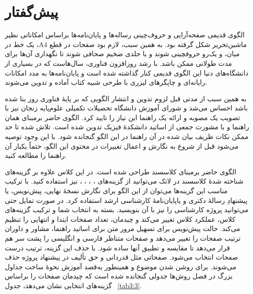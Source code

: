 \section*{پیش‌گفتار}
\thispagestyle{plain} %
الگوی قدیمی صفحه‌آرایی و حروف‌چینی رساله‌ها و پایان‌نامه‌ها براساس امکاناتی نظیر ماشین‌تحریر شکل گرفته بود. به همین سبب، لازم بود صفحات در قطع 
$\mathrm{A4}$، 
یک خط در میان، و یک‌رو حروفچینی شوند و با جلدی ضخیم صحافی شوند تا نگهداری آن‌ها برای مدت طولانی ممکن باشد. با رشد روزافزون فناوری، سال‌هاست که در بسیاری از دانشگاه‌های دنیا این الگوی قدیمی کنار گذاشته شده است و پایان‌نامه‌ها به مدد امکانات رایانه‌ای و چاپگرهای لیزری با طرحی شبیه کتاب آماده و تدوین می‌شوند.

به همین سبب از مدتی قبل لزوم تدوین و انتشار الگویی که بر پایهٔ فناوری روز بنا شده باشد احساس می‌شد و شورای آموزش دانشگاه تحصیلات تکمیلی علوم‌پایه زنجان نیز با تصویب یک مصوبه و ارائه یک راهنما این نیاز را تایید کرد. الگوی حاضر برمبنای همان راهنما و با مشورت جمعی از اساتید دانشکدهٔ فیزیک تدوین شده است. تلاش شده تا حد ممکن نکات ظریف بیان شده در آن راهنما در این الگو گنجانده شود. با این وجود توصیه می‌شود قبل از شروع به نگارش 
\thesis 
و اعمال تغییرات در محتوی این الگو، حتماً یکبار آن راهنما را مطالعه کنید.

الگوی حاضر برمبنای کلاس\dash سند 
طراحی شده است. در این کلاس علاوه بر گزینه‌های شناخته شدهٔ کلاس\dash سند
در لاتک می‌توانید از گزینه‌های 
، ، ، ، 
نیز استفاده کنید. با ترکیب مناسب این گزینه‌ها می‌توان از این الگو برای نگارش نسخهٔ نهایی، پیش‌نویس، یا پیشنهادِ رسالهٔ دکتری و یاپایان‌نامهٔ کارشناسی ارشد استفاده کرد. در صورت تمایل حتی می‌توانید پروژه کارشناسی را نیز با آن بنویسید. بسته به انتخاب شما و ترکیب گزینه‌های کلاس، عملکرد کلاس تغییر می‌کند و چیدمان، تعداد صفحات ابتدا و انتهایی را تنظیم می‌کند. حالت پیش‌نویس برای تسهیل مرور متن 
\thesis 
برای اساتید راهنما، مشاور و داوران ترتیب صفحات را تغییر می‌دهد و صفحات متناظر فارسی و انگلیسی را پشت سر هم قرار می‌دهد تا مقایسه و تطبیق آنها ساده شود. با حذف این گزینه، ترتیب درست صفحات انتخاب می‌شود. صفحاتی مثل قدردانی و حق تألیف در پیشنهاد پروژه حذف می‌شوند. برای روشن شدن موضوع و همینطور به‌قصد آموزش نحوهٔ ساخت جداول بزرگ در فصل روش‌ها جدولی گنجانده شده است که چیدمان صفحات را براساس گزینه‌های انتخابی نشان می‌دهد، جدول~
\ref{tab3:3}.

